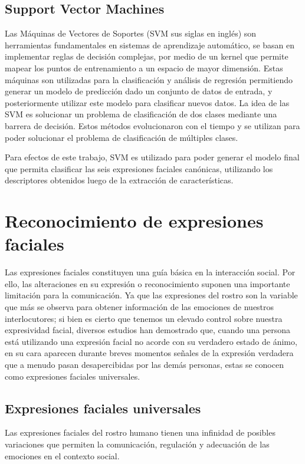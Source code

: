 	\subsection{Support Vector Machines}
	\label{sec:svm}
	Las Máquinas de Vectores de Soportes (SVM sus siglas en inglés) son herramientas fundamentales en sistemas de aprendizaje automático, se basan en  implementar reglas de decisión complejas, por medio de un kernel que permite mapear los puntos de entrenamiento a un espacio de mayor dimensión. Estas máquinas son utilizadas para la clasificación y análisis de regresión permitiendo generar un modelo de predicción dado un conjunto de datos de entrada, y posteriormente utilizar este modelo para clasificar nuevos datos.
La idea de las SVM es solucionar un problema de clasificación de dos clases mediante una barrera de decisión. Estos métodos evolucionaron con el tiempo y se utilizan para poder solucionar el problema de clasificación de múltiples clases.

Para efectos de este trabajo, SVM es utilizado para poder generar el modelo final que permita clasificar las seis expresiones faciales canónicas, utilizando los descriptores obtenidos luego de la extracción de características.

\section{Reconocimiento de expresiones faciales}
\label{sec:fer}
Las expresiones faciales constituyen una guía básica en la interacción social. Por ello, las alteraciones en su expresión o reconocimiento suponen una importante limitación para la comunicación. Ya que las expresiones del rostro son la variable que más se observa para obtener información de las emociones de nuestros interlocutores; si bien es cierto que tenemos un elevado control sobre nuestra expresividad facial, diversos estudios han demostrado que, cuando una persona está utilizando una expresión facial no acorde con su verdadero estado de ánimo, en su cara aparecen durante breves momentos señales de la expresión verdadera que a menudo pasan desapercibidas por las demás personas, estas se conocen como expresiones faciales universales.


\subsection{Expresiones faciales universales}
\label{sec:type_fe}

Las expresiones faciales del rostro humano tienen una infinidad de posibles variaciones que permiten la comunicación, regulación y adecuación de las emociones en el contexto social.

